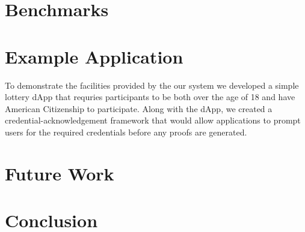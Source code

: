 \documentclass[11 pt]{extarticle}
\theoremstyle{remark}
\begin{document}
\section{Benchmarks}

\section{Example Application}

To demonstrate the facilities provided by the our system we developed a simple lottery dApp that requries participants to be
both over the age of 18 and have American Citizenship to participate. Along with the dApp, we created a credential-acknowledgement
framework that would allow applications to prompt users for the required credentials before any proofs are generated.



\section{Future Work}

\section{Conclusion}



\end{document}
